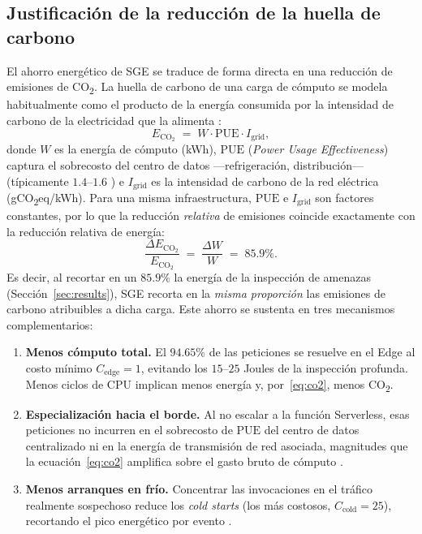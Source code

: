 \documentclass[10pt,twocolumn]{article}
\begin{document}
\subsection{Justificaci\'on de la reducci\'on de la huella de carbono}
\label{sec:carbon}
El ahorro energ\'etico de SGE se traduce de forma directa en una reducci\'on de
emisiones de CO\textsubscript{2}. La huella de carbono de una carga de c\'omputo se
modela habitualmente como el producto de la energ\'ia consumida por la intensidad de
carbono de la electricidad que la alimenta \cite{masanet,radu}:
\begin{equation}
\label{eq:co2}
E_{\mathrm{CO_2}} \;=\; W \cdot \mathrm{PUE} \cdot I_{\mathrm{grid}},
\end{equation}
donde $W$ es la energ\'ia de c\'omputo (kWh), $\mathrm{PUE}$ (\emph{Power Usage
Effectiveness}) captura el sobrecosto del centro de datos ---refrigeraci\'on,
distribuci\'on--- (t\'ipicamente $1.4$--$1.6$ \cite{masanet}) e $I_{\mathrm{grid}}$ es
la intensidad de carbono de la red el\'ectrica (gCO\textsubscript{2}eq/kWh). Para una
misma infraestructura, $\mathrm{PUE}$ e $I_{\mathrm{grid}}$ son factores constantes,
por lo que la reducci\'on \emph{relativa} de emisiones coincide exactamente con la
reducci\'on relativa de energ\'ia:
\begin{equation}
\label{eq:co2red}
\frac{\Delta E_{\mathrm{CO_2}}}{E_{\mathrm{CO_2}}} \;=\; \frac{\Delta W}{W} \;=\; 85.9\%.
\end{equation}
Es decir, al recortar en un $85.9\%$ la energ\'ia de la inspecci\'on de amenazas
(Secci\'on~\ref{sec:results}), SGE recorta en la \emph{misma proporci\'on} las
emisiones de carbono atribuibles a dicha carga. Este ahorro se sustenta en tres
mecanismos complementarios:
\begin{enumerate}\itemsep2pt
  \item \textbf{Menos c\'omputo total.} El $94.65\%$ de las peticiones se resuelve en
        el Edge al costo m\'inimo $C_{\text{edge}}=1$, evitando los $15$--$25$ Joules
        de la inspecci\'on profunda. Menos ciclos de CPU implican menos energ\'ia y,
        por~\eqref{eq:co2}, menos CO\textsubscript{2}.
  \item \textbf{Especializaci\'on hacia el borde.} Al no escalar a la funci\'on
        Serverless, esas peticiones no incurren en el sobrecosto de $\mathrm{PUE}$ del
        centro de datos centralizado ni en la energ\'ia de transmisi\'on de red
        asociada, magnitudes que la ecuaci\'on~\eqref{eq:co2} amplifica sobre el gasto
        bruto de c\'omputo \cite{radu,masanet}.
  \item \textbf{Menos arranques en fr\'io.} Concentrar las invocaciones en el tr\'afico
        realmente sospechoso reduce los \emph{cold starts} (los m\'as costosos,
        $C_{\text{cold}}=25$), recortando el pico energ\'etico por evento
        \cite{castro}.
\end{enumerate}
\end{document}
